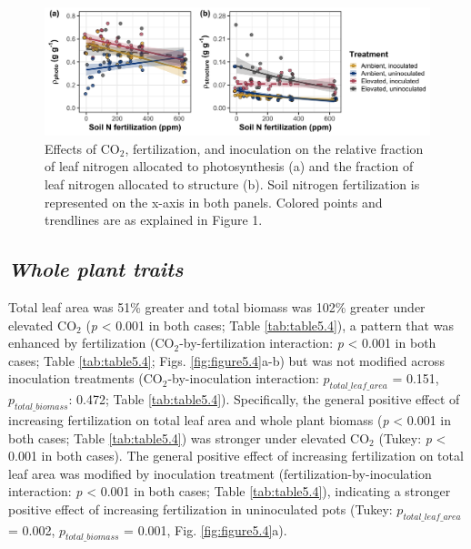\newpage
\begin{landscape}
    \begin{figure}
        \centering
        \includegraphics[scale = 0.075]{ch5_NxCO2xI/figs/NxCO2xI_fig3_propN.png}
        \caption[Effects of CO$_2$, fertilization, and inoculation on the relative fraction of leaf nitrogen allocated to photosynthesis and the fraction of leaf nitrogen allocated to structure.]{Effects of CO$_2$, fertilization, and inoculation on the relative fraction of leaf nitrogen allocated to photosynthesis (a) and the fraction of leaf nitrogen allocated to structure (b). Soil nitrogen fertilization is represented on the x-axis in both panels. Colored points and trendlines are as explained in Figure 1.}
        \label{fig:figure5.3}
    \end{figure}
\end{landscape}
\clearpage

\subsection{\textit{Whole plant traits}}
Total leaf area was 51\% greater and total biomass was 102\% greater under elevated CO$_2$ (\textit{p} < 0.001 in both cases; Table \ref{tab:table5.4}), a pattern that was enhanced by fertilization (CO$_2$-by-fertilization interaction: \textit{p} < 0.001 in both cases; Table \ref{tab:table5.4}; Figs. \ref{fig:figure5.4}a-b) but was not modified across inoculation treatments (CO$_2$-by-inoculation interaction: $p_{total\_leaf\_area}$ = 0.151, $p_{total\_biomass}$: 0.472; Table \ref{tab:table5.4}). Specifically, the general positive effect of increasing fertilization on total leaf area and whole plant biomass (\textit{p} < 0.001 in both cases; Table \ref{tab:table5.4}) was stronger under elevated CO$_2$ (Tukey: \textit{p} < 0.001 in both cases). The general positive effect of increasing fertilization on total leaf area was modified by inoculation treatment (fertilization-by-inoculation interaction: \textit{p} < 0.001 in both cases; Table \ref{tab:table5.4}), indicating a stronger positive effect of increasing fertilization in uninoculated pots (Tukey: $p_{total\_leaf\_area}$ = 0.002, $p_{total\_biomass}$ = 0.001, Fig. \ref{fig:figure5.4}a).

